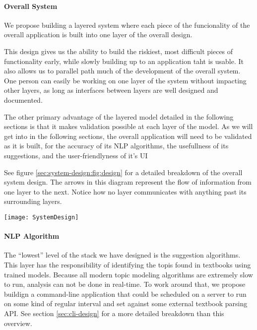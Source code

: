 \paragraph{Overall System}
We propose building a layered system where each piece of the
funcionality of the overall application is built into one layer of the
overall design.

This design gives us the ability to build the riskiest, most difficult
pieces of functionality early, while slowly building up to an
application taht is usable.
It also allows us to parallel path much of the development of the
overall system.
One person can easily be working on one layer of the system without
impacting other layers, as long as interfaces between layers are well
designed and documented.

The other primary advantage of the layered model detailed in the
following sections is that it makes validation possible at each layer
of the model.
As we will get into in the following sections, the overall application
will need to be validated as it is built, for the accuracy of its NLP
algorithms, the usefullness of its suggestions, and the
user-friendlyness of it's UI

See figure \ref{sec:system-design:fig:design} for a detailed
breakdown of the overall system design.
The arrows in this diagram represent the flow of information from one
layer to the next.
Notice how no layer communicates with anything past its surrounding layers.

\begin{figure*}[h]
\label{sec:system-design:fig:design}
\caption{Visualization of layered architecture}
\centering
\texttt{[image: SystemDesign]}
\end{figure*}

\paragraph{NLP Algorithm}
The ``lowest'' level of the stack we have designed is the suggestion
algorithms.
This layer has the responsibility of identifying the topis found in
textbooks using trained models.
Because all modern topic modeling algorithms are extremely slow to
run, analysis can not be done in real-time.
To work around that, we propose buildign a command-line application
that could be scheduled on a server to run on some kind of regular
interval and set against some external textbook parsing API.  
See section \ref{sec:cli-design} for a more detailed breakdown than
this overview.

